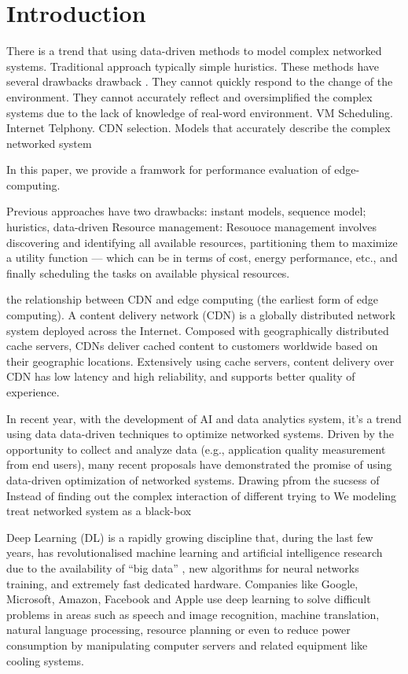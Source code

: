\documentclass[review]{elsarticle}
\begin{document}
\section{Introduction}
There is a trend \cite{Jiang2017Pytheas:Exploration-Exploitation} \cite{Mao2017NeuralPensieve} \cite{de}that using data-driven methods to model complex networked systems. Traditional approach typically simple huristics. These methods have several drawbacks drawback \cite{Mao2017NeuralPensieve}. They cannot quickly respond to the change of the environment. They cannot accurately reflect and oversimplified the complex systems due to the lack of knowledge of real-word environment. VM Scheduling. Internet Telphony. CDN selection. Models that accurately describe the complex networked system

In this paper, we provide a framwork for performance evaluation of edge-computing.

Previous approaches have two drawbacks: instant models, sequence model; huristics, data-driven Resource management: Resouoce management involves discovering and identifying all available resources, partitioning them to maximize a utility function --- which can be in terms of cost, energy performance, etc., and finally scheduling the tasks on available physical resources.

the relationship between CDN and edge computing (the earliest form of edge computing). A content delivery network (CDN) is a globally distributed network system deployed across the Internet. Composed with geographically distributed cache servers, CDNs deliver cached content  to  customers  worldwide  based  on their geographic locations. Extensively  using  cache  servers,  content  delivery over  CDN  has  low  latency  and  high  reliability,  and  supports better quality of experience.

In recent year, with the development of AI and data analytics system, it’s a trend using data data-driven techniques to optimize networked systems. Driven by the opportunity to collect and analyze data (e.g., application quality measurement from end users), many recent proposals have demonstrated the promise of using data-driven optimization of networked systems. Drawing pfrom the sucsess of Instead of finding out the complex interaction of different trying to We modeling treat networked system as a black-box

Deep Learning (DL) is a rapidly growing discipline that, during the last few years, has revolutionalised machine learning and artificial intelligence research due to the availability of “big data” , new algorithms for neural networks training, and extremely fast dedicated hardware. Companies like Google, Microsoft, Amazon, Facebook and Apple use deep learning to solve difficult problems in areas such as speech and image recognition, machine translation, natural language processing, resource planning or even to reduce power consumption by manipulating computer servers and related equipment like cooling systems.
\end{document}
